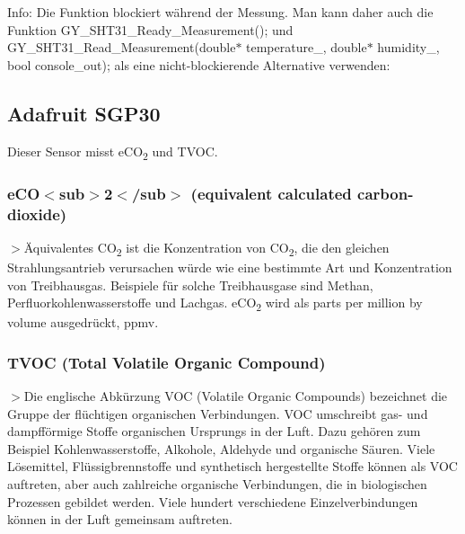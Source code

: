 Info\+: Die Funktion blockiert während der Messung. Man kann daher auch die Funktion {\ttfamily G\+Y\+\_\+\+S\+H\+T31\+\_\+\+Ready\+\_\+\+Measurement();} und {\ttfamily G\+Y\+\_\+\+S\+H\+T31\+\_\+\+Read\+\_\+\+Measurement(double$\ast$ temperature\+\_\+, double$\ast$ humidity\+\_\+, bool console\+\_\+out);} als eine nicht-\/blockierende Alternative verwenden\+: 
\begin{DoxyCode}{0}
\DoxyCodeLine{}
\end{DoxyCode}
\hypertarget{autotoc_md0_autotoc_md5}{}\subsection{Adafruit S\+G\+P30}\label{autotoc_md0_autotoc_md5}
Dieser Sensor misst e\+CO\textsubscript{2} und T\+V\+OC. \hypertarget{autotoc_md0_autotoc_md6}{}\subsubsection{e\+C\+O$<$sub$>$2$<$/sub$>$ (equivalent calculated carbon-\/dioxide)}\label{autotoc_md0_autotoc_md6}
$>$Äquivalentes CO\textsubscript{2} ist die Konzentration von CO\textsubscript{2}, die den gleichen Strahlungsantrieb verursachen würde wie eine bestimmte Art und Konzentration von Treibhausgas. Beispiele für solche Treibhausgase sind Methan, Perfluorkohlenwasserstoffe und Lachgas. e\+CO\textsubscript{2} wird als parts per million by volume ausgedrückt, ppmv.\hypertarget{autotoc_md0_autotoc_md7}{}\subsubsection{T\+V\+O\+C (\+Total Volatile Organic Compound)}\label{autotoc_md0_autotoc_md7}
$>$Die englische Abkürzung V\+OC (Volatile Organic Compounds) bezeichnet die Gruppe der flüchtigen organischen Verbindungen. V\+OC umschreibt gas-\/ und dampfförmige Stoffe organischen Ursprungs in der Luft. Dazu gehören zum Beispiel Kohlenwasserstoffe, Alkohole, Aldehyde und organische Säuren. Viele Lösemittel, Flüssigbrennstoffe und synthetisch hergestellte Stoffe können als V\+OC auftreten, aber auch zahlreiche organische Verbindungen, die in biologischen Prozessen gebildet werden. Viele hundert verschiedene Einzelverbindungen können in der Luft gemeinsam auftreten.

